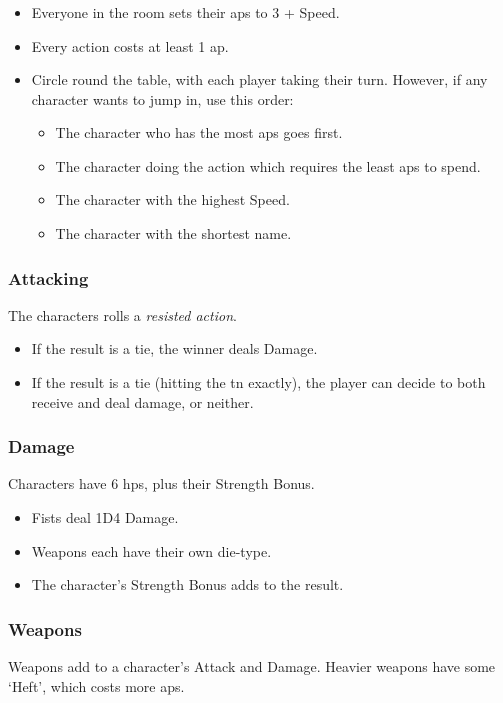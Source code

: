 \subsubsection*{}

\begin{itemize}

  \item
  Everyone in the room sets their \glspl{ap} to 3 + Speed.
  \item
  Every action costs at least 1 \gls{ap}.
  \item
  Circle round the table, with each player taking their turn.
  However, if any character wants to jump in, use this order:
  \begin{itemize}
    \item
    The character who has the most \glspl{ap} goes first.
    \item
    The character doing the action which requires the least \glspl{ap} to spend.
    \item
    The character with the highest Speed.
    \item
    The character with the shortest name.
  \end{itemize}
\end{itemize}

\subsubsection*{Attacking}

The characters rolls a \textit{resisted action}.
\begin{itemize}
  \item
  If the result is a tie, the winner deals Damage.
  \item
  If the result is a tie (hitting the \gls{tn} exactly), the player can decide to both receive and deal damage, or neither.
\end{itemize}

\subsubsection*{Damage}

Characters have 6 \glspl{hp}, plus their Strength Bonus.

\begin{itemize}

  \item
  Fists deal 1D4 Damage.
  \item
  Weapons each have their own die-type.
  \item
  The character's Strength Bonus adds to the result.
\end{itemize}

\subsubsection*{Weapons}

Weapons add to a character's Attack and Damage.
Heavier weapons have some `Heft', which costs more \glspl{ap}.

